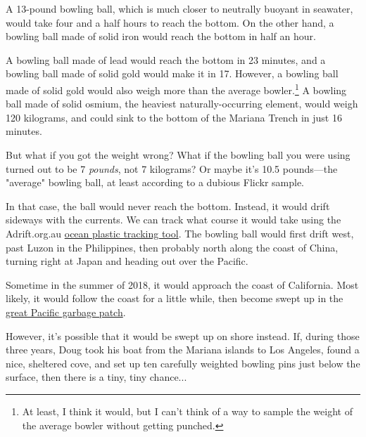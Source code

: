 {{A 13-pound bowling ball, which is much closer to neutrally buoyant in seawater, would take four and a half hours to reach the bottom. On the other hand, a bowling ball made of solid iron would reach the bottom in half an hour.}

{A bowling ball made of lead would reach the bottom in 23 minutes, and a bowling ball made of solid gold would make it in 17. However, a bowling ball made of solid gold would also weigh more than the average bowler.{\footnote{At least, I think it would, but I can't think of a way to sample the weight of the average bowler without getting punched.} } A bowling ball made of solid osmium, the heaviest naturally-occurring element, would weigh 120 kilograms, and could sink to the bottom of the Mariana Trench in just 16 minutes.}

{But what if you got the weight wrong? What if the bowling ball you were using turned out to be 7 \emph{pounds}, not 7 kilograms? Or maybe it's 10.5 pounds—the "average" bowling ball, at least according to a dubious Flickr sample.}

{In that case, the ball would never reach the bottom. Instead, it would drift sideways with the currents. We can track what course it would take using the Adrift.org.au \href{http://www.adrift.org.au/map?lat=11.3&lng=142.6&center=-180&startmon=Jan}{ocean plastic tracking tool}. The bowling ball would first drift west, past Luzon in the Philippines, then probably north along the coast of China, turning right at Japan and heading out over the Pacific.}

{Sometime in the summer of 2018, it would approach the coast of California. Most likely, it would follow the coast for a little while, then become swept up in the \href{https://en.wikipedia.org/wiki/Great\_Pacific\_garbage\_patch}{great Pacific garbage patch}.}

{However, it's possible that it would be swept up on shore instead. If, during those three years, Doug took his boat from the Mariana islands to Los Angeles, found a nice, sheltered cove, and set up ten carefully weighted bowling pins just below the surface, then there is a tiny, tiny chance...}

}
